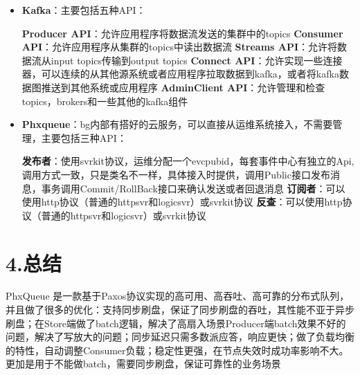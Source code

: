 \documentclass{article}
\begin{document}
\begin{itemize}%

\item{}
\textbf{Kafka}：主要包括五种API： %

\textbf{Producer API}：允许应用程序将数据流发送的集群中的topics\mdbr
{}\textbf{Consumer API}：允许应用程序从集群的topics中读出数据流\mdbr
{}\textbf{Streams API}：允许将数据流从input topics传输到output topics\mdbr
{}\textbf{Connect API}：允许实现一些连接器，可以连续的从其他源系统或者应用程序拉取数据到kafka，或者将kafka数据图推送到其他系统或应用程序\mdbr
{}\textbf{AdminClient API}：允许管理和检查topics，brokers和一些其他的kafka组件 %

\item{}
\textbf{Phxqueue}：bg内部有搭好的云服务，可以直接从运维系统接入，不需要管理，主要包括三种API： %

\textbf{发布者}：使用svrkit协议，运维分配一个evcpubid，每套事件中心有独立的Api, 调用方式一致，只是类名不一样，具体接入时提供，调用Public接口发布消息，事务调用Commit/RollBack接口来确认发送或者回退消息\mdbr
{}\textbf{订阅者}：可以使用http协议（普通的httpsvr和logicsvr）或svrkit协议\mdbr
{}\textbf{反查}：可以使用http协议（普通的httpsvr和logicsvr）或svrkit协议 %
\end{itemize}%

\section{4.\hspace*{0.5em}总结}\label{section}%

\noindent{}\hspace*{1em}\hspace*{1em}PhxQueue 是一款基于Paxos协议实现的高可用、高吞吐、高可靠的分布式队列，并且做了很多的优化：支持同步刷盘，保证了同步刷盘的吞吐，其性能不亚于异步刷盘；在Store端做了batch逻辑，解决了高扇入场景Producer端batch效果不好的问题，解决了写放大的问题；同步延迟只需多数派应答，响应更快；做了负载均衡的特性，自动调整Consumer负载；稳定性更强，在节点失效时成功率影响不大。更加是用于不能做batch，需要同步刷盘，保证可靠性的业务场景%
\end{document}
